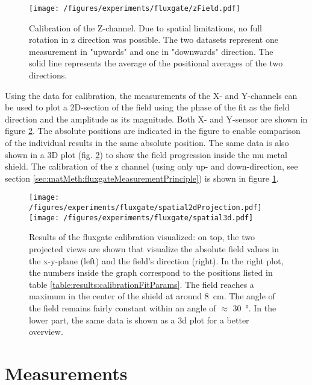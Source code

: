         \begin{figure}
            \centering
            \texttt{[image: /figures/experiments/fluxgate/zField.pdf]}
            \caption[calibration results Z]{Calibration of the Z-channel. Due to spatial limitations, no full rotation in z direction was possible. The two datasets represent one measurement in "upwards" and one in "downwards" direction. The solid line represents the average of the positional averages of the two directions.}
            \label{fig:results:fluxgate:zcal}
        \end{figure}
        Using the data for calibration, the measurements of the X- and Y-channels can be used to plot a 2D-section of the field using the phase of the fit as the field direction and the amplitude as its magnitude. Both X- and Y-sensor are shown in figure \ref{fig:results:fluxgate:plotSpatial}. The absolute positions are indicated in the figure to enable comparison of the individual results in the same absolute position. The same data is also shown in a 3D plot (fig. \ref{fig:results:fluxgate:plotSpatial}) to show the field progression inside the mu metal shield. The calibration of the z channel (using only up- and down-direction, see section \ref{sec:matMeth:fluxgateMeasurementPrinciple}) is shown in figure \ref{fig:results:fluxgate:zcal}.
        \begin{figure}
            \centering
            \texttt{[image: /figures/experiments/fluxgate/spatial2dProjection.pdf]}
            \texttt{[image: /figures/experiments/fluxgate/spatial3d.pdf]}
            \caption[Fluxgate calibration]{Results of the fluxgate calibration visualized: on top, the two projected views are shown that visualize the absolute field values in the x-y-plane (left) and the field's direction (right). In the right plot, the numbers inside the graph correspond to the positions listed in table \ref{table:results:calibrationFitParams}. The field reaches a maximum in the center of the shield at around \SI{8}{\centi\meter}. The angle of the field remains fairly constant within an angle of $\approx$ \SI{30}{\degree}. In the lower part, the same data is shown as a 3d plot for a better overview.}
            \label{fig:results:fluxgate:plotSpatial}
        \end{figure}
\section{Measurements}
